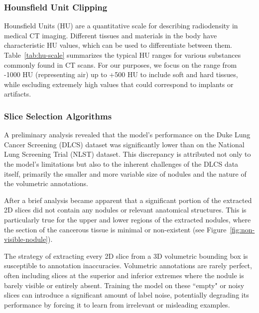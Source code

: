 \subsubsection{Hounsfield Unit Clipping}
\label{sec:hu-clipping}
Hounsfield Units (HU) are a quantitative scale for describing radiodensity in medical CT imaging. Different tissues and materials in the body have characteristic HU values, which can be used to differentiate between them. Table~\ref{tab:hu-scale} summarizes the typical HU ranges for various substances commonly found in CT scans. For our purposes, we focus on the range from -1000 HU (representing air) up to +500 HU to include soft and hard tissues, while escluding extremely high values that could correspond to implants or artifacts.


\subsubsection{Slice Selection Algorithms}
\label{sec:dataset_pruning}
A preliminary analysis revealed that the model's performance on the Duke Lung Cancer Screening (DLCS) dataset was significantly lower than on the National Lung Screening Trial (NLST) dataset. This discrepancy is attributed not only to the model's limitations but also to the inherent challenges of the DLCS data itself, primarily the smaller and more variable size of nodules and the nature of the volumetric annotations.

After a brief analysis became apparent that a significant portion of the extracted 2D slices did not contain any nodules or relevant anatomical structures. This is particularly true for the upper and lower regions of the extracted nodules, where the section of the cancerous tissue is minimal or non-existent (see Figure~\ref{fig:non-visible-nodule}).



The strategy of extracting every 2D slice from a 3D volumetric bounding box is susceptible to annotation inaccuracies. Volumetric annotations are rarely perfect, often including slices at the superior and inferior extremes where the nodule is barely visible or entirely absent. Training the model on these ``empty" or noisy slices can introduce a significant amount of label noise, potentially degrading its performance by forcing it to learn from irrelevant or misleading examples.

